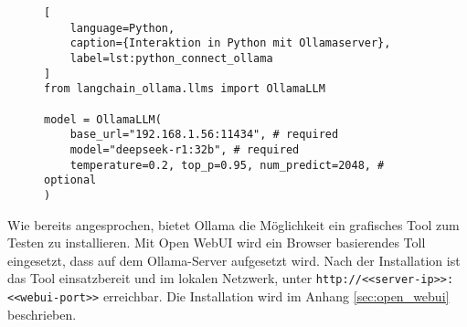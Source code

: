 \begin{figure}[!ht]
\begin{lstlisting}[
	language=Python,
	caption={Interaktion in Python mit Ollamaserver},
	label=lst:python_connect_ollama
]
from langchain_ollama.llms import OllamaLLM

model = OllamaLLM(
    base_url="192.168.1.56:11434", # required
    model="deepseek-r1:32b", # required
    temperature=0.2, top_p=0.95, num_predict=2048, # optional
)
\end{lstlisting}
\end{figure}

Wie bereits angesprochen, bietet Ollama die Möglichkeit ein grafisches Tool zum Testen zu installieren. Mit Open WebUI wird ein Browser basierendes Toll eingesetzt, dass auf dem Ollama-Server aufgesetzt wird. Nach der Installation ist das Tool einsatzbereit und im lokalen Netzwerk, unter \texttt{http://<<server-ip>>:<<webui-port>>} erreichbar. Die Installation wird im Anhang \ref{sec:open_webui} beschrieben.\vspace{0.2cm}
